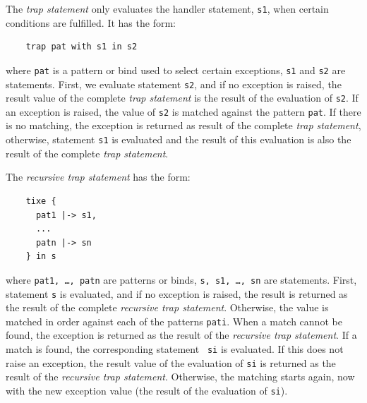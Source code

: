 \documentclass{overturerepchap}
\begin{document}
{\begin{description}
  The {\it trap statement\/} only evaluates the handler statement,
{\tt s1}, when certain conditions are fulfilled. It has the form:
\begin{lstlisting}
    trap pat with s1 in s2
\end{lstlisting}
where {\tt pat} is a pattern or bind used to select certain
exceptions, {\tt s1} and {\tt s2} are statements. First, we evaluate
statement {\tt s2}, and if no exception is raised, the result value of
the complete {\it trap statement\/} is the result of the evaluation of
{\tt s2}. If an exception is raised, the value of {\tt s2} is matched
against the pattern {\tt pat}. If there is no matching, the exception
is returned as result of the complete {\it trap statement}, otherwise,
statement {\tt s1} is evaluated and the result of this evaluation is
also the result of the complete {\it trap statement}.

  The {\it recursive trap statement\/} has the form:
  \begin{lstlisting}
    tixe {
      pat1 |-> s1,
      ...
      patn |-> sn
    } in s
  \end{lstlisting}
  where {\tt pat1, \ldots, patn} are patterns or binds, {\tt s, s1, \ldots,
    sn} are statements. First, statement {\tt s} is evaluated, and if no
  exception is raised, the result is returned as the result of the complete
  {\it recursive trap statement}. Otherwise, the value is matched in order
  against each of the patterns {\tt pati}. When a match cannot be found,
  the exception is returned as the result of the {\it recursive trap
    statement}. If a match is found, the corresponding statement {\tt
    si} is evaluated. If this does not raise an exception, the result value
  of the evaluation of {\tt si} is returned as the result of the {\it
    recursive trap statement}. Otherwise, the matching starts again, now
  with the new exception value (the result of the evaluation of {\tt si}).


\end{description}}
\end{document}
